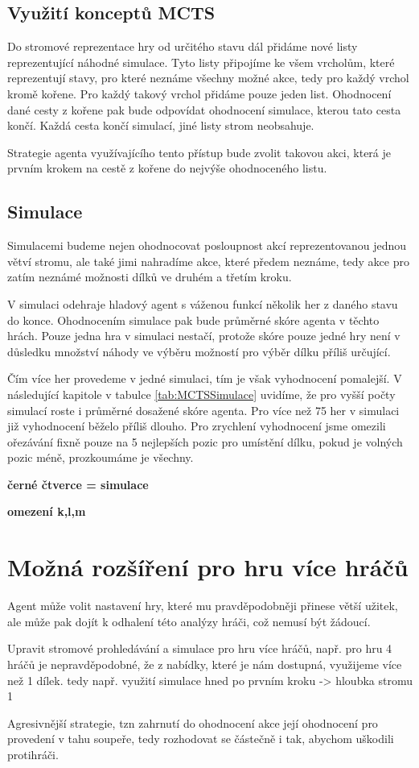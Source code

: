 \subsection{Využití konceptů MCTS}

Do stromové reprezentace hry od určitého stavu dál přidáme nové listy reprezentující náhodné simulace. Tyto listy připojíme ke všem vrcholům, které reprezentují stavy, pro které neznáme všechny možné akce, tedy pro každý vrchol kromě kořene. Pro každý takový vrchol přidáme pouze jeden list.
Ohodnocení dané cesty z kořene pak bude odpovídat ohodnocení simulace, kterou tato cesta končí. Každá cesta končí simulací, jiné listy strom neobsahuje.

Strategie agenta využívajícího tento přístup bude zvolit takovou akci, která je prvním krokem na cestě z kořene do nejvýše ohodnoceného listu. 

\subsection{Simulace}

Simulacemi budeme nejen ohodnocovat posloupnost akcí reprezentovanou jednou větví stromu, ale také jimi nahradíme akce, které předem neznáme, tedy akce pro zatím neznámé možnosti dílků ve druhém a třetím kroku.

V simulaci odehraje hladový agent s váženou funkcí několik her z daného stavu do konce. Ohodnocením simulace pak bude průměrné skóre agenta v těchto hrách. Pouze jedna hra v simulaci nestačí, protože skóre pouze jedné hry není v důsledku množství náhody ve výběru možností pro výběr dílku příliš určující.

Čím více her provedeme v jedné simulaci, tím je však vyhodnocení pomalejší. V následující kapitole v tabulce \ref{tab:MCTSSimulace} uvidíme, že pro vyšší počty simulací roste i průměrné dosažené skóre agenta. Pro více než 75 her v simulaci již vyhodnocení běželo příliš dlouho. Pro zrychlení vyhodnocení jsme omezili ořezávání fixně pouze na 5 nejlepších pozic pro umístění dílku, pokud je volných pozic méně, prozkoumáme je všechny.

\figureMCTS

\textbf{černé čtverce = simulace}

\textbf{omezení k,l,m}

\section{Možná rozšíření pro hru více hráčů}

Agent může volit nastavení hry, které mu pravděpodobněji přinese větší užitek, ale může pak dojít k odhalení této analýzy hráči, což nemusí být žádoucí. 

Upravit stromové prohledávání a simulace pro hru více hráčů, např. pro hru 4 hráčů je nepravděpodobné, že z nabídky, které je nám dostupná, využijeme více než 1 dílek. tedy např. využití simulace hned po prvním kroku -> hloubka stromu 1

Agresivnější strategie, tzn zahrnutí do ohodnocení akce její ohodnocení pro provedení v tahu soupeře, tedy rozhodovat se částečně i tak, abychom uškodili protihráči. 